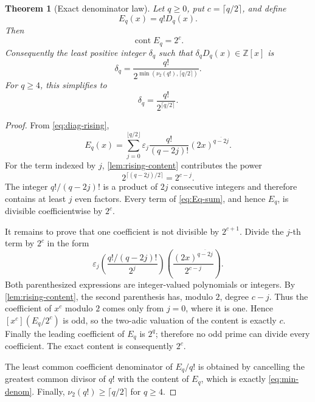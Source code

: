 \documentclass[11pt]{article}
\newtheorem{theorem}{Theorem}[section]
\theoremstyle{definition}
\theoremstyle{remark}
\newcommand{\Z}{\mathbb Z}
\newcommand{\eps}{\varepsilon}
\newcommand{\Diag}{D}
\newcommand{\rising}[2]{#1^{\overline{#2}}}
\newcommand{\cont}{\operatorname{cont}}
\newcommand{\vTwo}{\nu_2}
\begin{document}
\begin{theorem}[Exact denominator law]\label{thm:denominator}
Let \(q\geq0\), put \(c=\lceil q/2\rceil\), and define
\begin{equation}
 E_q(x)=q!\Diag_q(x).
\end{equation}
Then
\begin{equation}
 \boxed{\cont E_q=2^c.}                                    \label{eq:content-exact}
\end{equation}
Consequently the least positive integer \(\delta_q\) such that
\(\delta_q\Diag_q(x)\in\Z[x]\) is
\begin{equation}
 \boxed{
 \delta_q=\frac{q!}{2^{\min(\vTwo(q!),\lceil q/2\rceil)}}.}             \label{eq:min-denom}
\end{equation}
For \(q\geq4\), this simplifies to
\begin{equation}
 \delta_q=\frac{q!}{2^{\lceil q/2\rceil}}.                \label{eq:min-denom-large}
\end{equation}
\end{theorem}

\begin{proof}
From \cref{eq:diag-rising},
\begin{equation}
 E_q(x)=\sum_{j=0}^{\lfloor q/2\rfloor}
 \eps_j\frac{q!}{(q-2j)!}\rising{(2x)}{q-2j}.             \label{eq:Eq-sum}
\end{equation}
For the term indexed by \(j\), \cref{lem:rising-content} contributes the
power
\[
 2^{\lceil(q-2j)/2\rceil}=2^{c-j}.
\]
The integer \(q!/(q-2j)!\) is a product of \(2j\) consecutive integers and
therefore contains at least \(j\) even factors.  Every term of
\cref{eq:Eq-sum}, and hence \(E_q\), is divisible coefficientwise by
\(2^c\).

It remains to prove that one coefficient is not divisible by \(2^{c+1}\).
Divide the \(j\)-th term by \(2^c\) in the form
\[
 \eps_j
 \left(\frac{q!/(q-2j)!}{2^j}\right)
 \left(\frac{\rising{(2x)}{q-2j}}{2^{c-j}}\right).
\]
Both parenthesized expressions are integer-valued polynomials or integers.
By \cref{lem:rising-content}, the second parenthesis has, modulo \(2\),
degree \(c-j\).  Thus the coefficient of \(x^c\) modulo \(2\) comes only
from \(j=0\), where it is one.  Hence \([x^c](E_q/2^c)\) is odd, so the
two-adic valuation of the content is exactly \(c\).  Finally the leading
coefficient of \(E_q\) is \(2^q\); therefore no odd prime can divide every
coefficient.  The exact content is consequently \(2^c\).

The least common coefficient denominator of \(E_q/q!\) is obtained by
cancelling the greatest common divisor of \(q!\) with the content of
\(E_q\), which is exactly \cref{eq:min-denom}.  Finally,
\(\vTwo(q!)\geq\lceil q/2\rceil\) for \(q\geq4\).
\end{proof}
\end{document}
